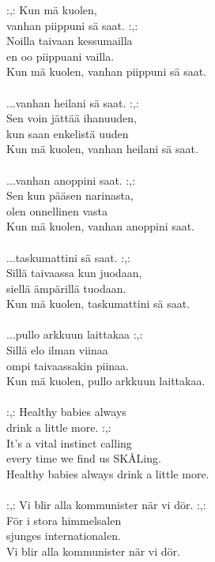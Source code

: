 
:,: Kun mä kuolen, \\ vanhan piippuni sä saat. :,: \\ Noilla taivaan kessumailla \\ en oo piippuani vailla. \\ Kun mä kuolen, vanhan piippuni sä saat. \\ \hspace{10mm} \\ ...vanhan heilani sä saat. :,: \\ Sen voin jättää ihanuuden, \\ kun saan enkelistä uuden \\ Kun mä kuolen, vanhan heilani sä saat. \\ \hspace{10mm} \\ ...vanhan anoppini saat. :,: \\ Sen kun pääsen narinasta, \\ olen onnellinen vasta \\ Kun mä kuolen, vanhan anoppini saat. \\ \hspace{10mm} \\ ...taskumattini sä saat. :,: \\ Sillä taivaassa kun juodaan, \\ siellä ämpärillä tuodaan. \\ Kun mä kuolen, taskumattini sä saat. \\ \hspace{10mm} \\ ...pullo arkkuun laittakaa :,: \\ Sillä elo ilman viinaa \\ ompi taivaassakin piinaa. \\ Kun mä kuolen, pullo arkkuun laittakaa. \\ \hspace{10mm} \\ :,: Healthy babies always \\ drink a little more. :,: \\ It's a vital instinct calling \\ every time we find us SKÅLing. \\ Healthy babies always drink a little more. \\ \hspace{10mm} \\ :,: Vi blir alla kommunister när vi dör. :,: \\ För i stora himmelsalen \\ sjunges internationalen. \\ Vi blir alla kommunister när vi dör.
